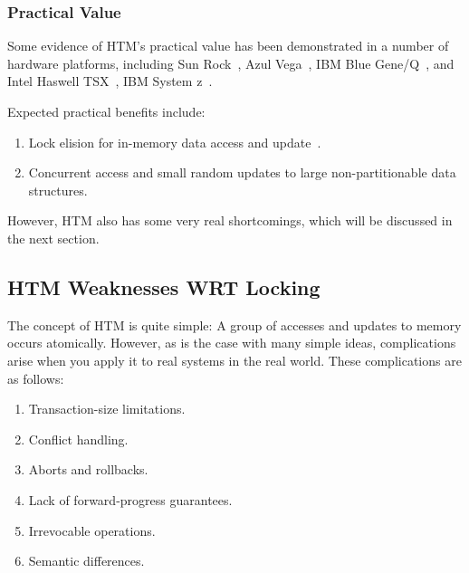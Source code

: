 \QuickQuizEnd

\subsubsection{Practical Value}
\label{sec:future:Practical Value}

Some evidence of HTM's practical value has been demonstrated in a number
of hardware platforms, including
Sun Rock~\cite{DaveDice2009ASPLOSRockHTM},
Azul Vega~\cite{CliffClick2009AzulHTM},
IBM Blue Gene/Q~\cite{RickMerrit2011PowerTM}, and
Intel Haswell TSX~\cite{RaviRajwar2012TSX},
IBM System z~\cite{ChristianJacobi2012MainframeTM}.

Expected practical benefits include:

\begin{enumerate}
\item	Lock elision for in-memory data access and
	update~\cite{Martinez01a,Rajwar02a}.
\item	Concurrent access and small random updates to large non-partitionable
	data structures.
\end{enumerate}

However, HTM also has some very real shortcomings, which will be discussed
in the next section.

\subsection{HTM Weaknesses WRT Locking}
\label{sec:future:HTM Weaknesses WRT Locking}

The concept of HTM is quite simple: A group of accesses and updates to
memory occurs atomically.
However, as is the case with many simple ideas, complications arise
when you apply it to real systems in the real world.
These complications are as follows:

\begin{enumerate}
\item	Transaction-size limitations.
\item	Conflict handling.
\item	Aborts and rollbacks.
\item	Lack of forward-progress guarantees.
\item	Irrevocable operations.
\item	Semantic differences.
\end{enumerate}

